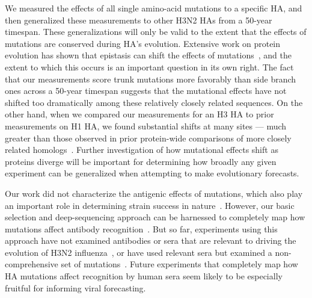 \documentclass[9pt,twocolumn,twoside]{pnas-new}
\begin{document}
We measured the effects of all single amino-acid mutations to a specific HA, and then generalized these measurements to other H3N2 HAs from a 50-year timespan.
These generalizations will only be valid to the extent that the effects of mutations are conserved during HA's evolution.
Extensive work on protein evolution has shown that epistasis can shift the effects of mutations~\cite{gong2013stability,natarajan2013epistasis,harms2014historical,starr2016epistasis,starr2017alternative,haddox2017mapping}, and the extent to which this occurs is an important question in its own right.
The fact that our measurements score trunk mutations more favorably than side branch ones across a 50-year timespan suggests that the mutational effects have not shifted too dramatically among these relatively closely related sequences.
On the other hand, when we compared our measurements for an H3 HA to prior measurements on H1 HA, we found substantial shifts at many sites --- much greater than those observed in prior protein-wide comparisons of more closely related homologs~\cite{doud2015site,haddox2017mapping}.
Further investigation of how mutational effects shift as proteins diverge will be important for determining how broadly any given experiment can be generalized when attempting to make evolutionary forecasts.

Our work did not characterize the antigenic effects of mutations, which also play an important role in determining strain success in nature~\cite{koel2013substitutions,neher2016prediction}.
However, our basic selection and deep-sequencing approach can be harnessed to completely map how mutations affect antibody recognition~\cite{doud2017complete,doud2017quantifying}.
But so far, experiments using this approach have not examined antibodies or sera that are relevant to driving the evolution of H3N2 influenza~\cite{doud2017complete,doud2017quantifying}, or have used relevant sera but examined a non-comprehensive set of mutations~\cite{li2016selection}.
Future experiments that completely map how HA mutations affect recognition by human sera seem likely to be especially fruitful for informing viral forecasting.
\end{document}
